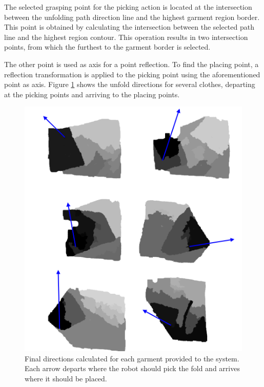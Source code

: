 The selected grasping point for the picking action is located at the intersection between the unfolding path direction line and the highest garment region border. This point is obtained by calculating the intersection between the selected path line and the highest region contour. This operation results in two intersection points, from which the furthest to the garment border is selected.

The other point is used as axis for a point reflection. To find the placing point, a reflection transformation is applied to the picking point using the aforementioned point as axis. Figure \ref{fig:directions} shows the unfold directions for several clothes, departing at the picking points and arriving to the placing points.

\begin{figure}[thpb]
    \centering
    \includegraphics[width=\textwidth]
    {figures/directions.pdf}
    \caption{Final directions calculated for each garment provided to the system. Each arrow departs where the robot should pick the fold and arrives where it should be placed.}
    \label{fig:directions}
\end{figure}


